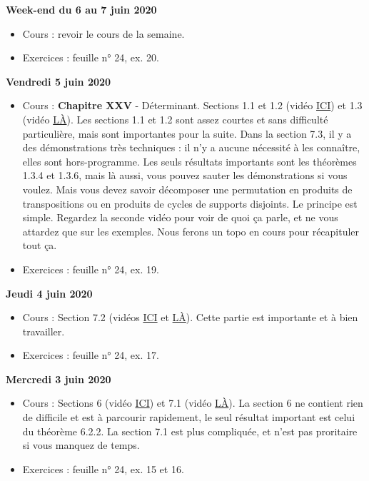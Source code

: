 \documentclass[12pt,a4paper]{article}
\begin{document}
\noindent\textbf{Week-end du 6 au 7 juin 2020}
\begin{itemize}
\item Cours : revoir le cours de la semaine.
\item Exercices : feuille n° 24, ex. 20.\vspace{.4cm}
\end{itemize}

\noindent\textbf{Vendredi 5 juin 2020}
\begin{itemize}
\item Cours : \textbf{Chapitre XXV} - Déterminant. Sections 1.1 et 1.2 (vidéo \href{https://youtu.be/s-WUHnSWgLs}{ ICI}) et 1.3 (vidéo \href{https://youtu.be/UtaFPRkdxU8}{ LÀ}). Les sections 1.1 et 1.2 sont assez courtes et sans difficulté particulière, mais sont importantes pour la suite. Dans la section 7.3, il y a des démonstrations très techniques : il n'y a aucune nécessité à les connaître, elles sont hors-programme. Les seuls résultats importants sont les théorèmes 1.3.4 et 1.3.6, mais là aussi, vous pouvez sauter les démonstrations si vous voulez. Mais vous devez savoir décomposer une permutation en produits de transpositions ou en produits de cycles de supports disjoints. Le principe est simple. Regardez la seconde vidéo pour voir de quoi ça parle, et ne vous attardez que sur les exemples. Nous ferons un topo en cours pour récapituler tout ça.
\item Exercices : feuille n° 24, ex. 19.\vspace{.4cm}
\end{itemize}

\noindent\textbf{Jeudi 4 juin 2020}
\begin{itemize}
\item Cours : Section 7.2 (vidéos \href{https://youtu.be/uxTWn1yr0dE}{ ICI} et \href{https://youtu.be/AtZB0jCKsfM}{ LÀ}). Cette partie est importante et à bien travailler.
\item Exercices : feuille n° 24, ex. 17.\vspace{.4cm}
\end{itemize}
 
\noindent\textbf{Mercredi 3 juin 2020}
\begin{itemize}
\item Cours : Sections 6 (vidéo \href{https://youtu.be/eLJ-axFV7ag}{ ICI}) et 7.1 (vidéo \href{https://youtu.be/0K9zS6irk18}{ LÀ}). La section 6 ne contient rien de difficile et est à parcourir rapidement, le seul résultat important est celui du théorème 6.2.2. La section 7.1 est plus compliquée, et n'est pas proritaire si vous manquez de temps.
\item Exercices : feuille n° 24, ex. 15 et 16.\vspace{.4cm}
\end{itemize}
\end{document}
